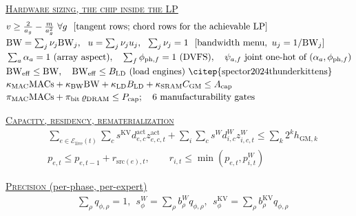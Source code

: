 \begin{landscape}
\begin{center}
{\begin{minipage}{0.965\linewidth}
\begin{minipage}[t]{0.485\linewidth}
\underline{\textsc{Hardware sizing, the chip inside the LP}}
\vspace{-2pt}
\begin{align*}
&v\ge \tfrac{2}{a_g}-\tfrac{m}{a_g^{2}}\ \forall g\ \ [\text{tangent rows; chord rows for the achievable LP}]\\[-1pt]
&\mathrm{BW}=\textstyle\sum_j\nu_j\mathrm{BW}_j,\ \ u=\sum_j\nu_j u_j,\ \ \sum_j\nu_j=1\ \ [\text{bandwidth menu},\ u_j=1/\mathrm{BW}_j]\\[-1pt]
&\textstyle\sum_a\alpha_a=1\ \text{(array aspect)},\quad \sum_f\phi_{\mathrm{ph},f}=1\ \text{(DVFS)},\quad \psi_{a,f}\ \text{joint one-hot of }(\alpha_a,\phi_{\mathrm{ph},f})\\[-1pt]
&\mathrm{BW_{eff}}\le\mathrm{BW},\quad \mathrm{BW_{eff}}\le B_{\mathrm{LD}}\ \text{(load engines) \citep{spector2024thunderkittens}}\\[-1pt]
&\kappa_{\mathrm{MAC}}\mathrm{MACs}+\kappa_{\mathrm{BW}}\mathrm{BW}+\kappa_{\mathrm{LD}}B_{\mathrm{LD}}+\kappa_{\mathrm{SRAM}}C_{\mathrm{GM}}\le A_{\mathrm{cap}}\\[-1pt]
&\pi_{\mathrm{MAC}}\mathrm{MACs}+\pi_{\mathrm{bit}}\,\varrho_{\mathrm{DRAM}}\le P_{\mathrm{cap}};\quad \text{6 manufacturability gates}
\end{align*}
\end{minipage}%
\hfill
\vrule
\hfill
\begin{minipage}[t]{0.485\linewidth}
\underline{\textsc{Capacity, residency, rematerialization} \citep{dao2022flashattention}}
\vspace{-2pt}
\begin{align*}
&\textstyle\sum_{e\in\mathcal E_{\mathrm{live}}(t)}\!\sum_c s^{\mathrm{KV}}d^{\mathrm{act}}_{e,c}z^{\mathrm{act}}_{e,c,t}
 +\sum_{i}\sum_c s^{W}d^{W}_{i,c}z^{W}_{i,c,t}\le\textstyle\sum_k 2^k h_{\mathrm{GM},k}\\[-1pt]
&p_{e,t}\le p_{e,t-1}+r_{\mathrm{src}(e),t},\qquad r_{i,t}\le\min(p_{e,t},p^W_{i,t})
\end{align*}
\vspace{-8pt}

\underline{\textsc{Precision} (per-phase, per-expert) \citep{lin2024awq,frantar2023gptq,hooper2024kvquant}}
\vspace{-2pt}
\begin{align*}
&\textstyle\sum_\rho q_{\phi,\rho}=1,\ \ s^{W}_\phi=\sum_\rho b^W_\rho q_{\phi,\rho},\ \ s^{\mathrm{KV}}_\phi=\sum_\rho b^{\mathrm{KV}}_\rho q_{\phi,\rho}
\end{align*}
\vspace{-8pt}


\end{minipage}
\end{minipage}}
\end{center}
\end{landscape}
